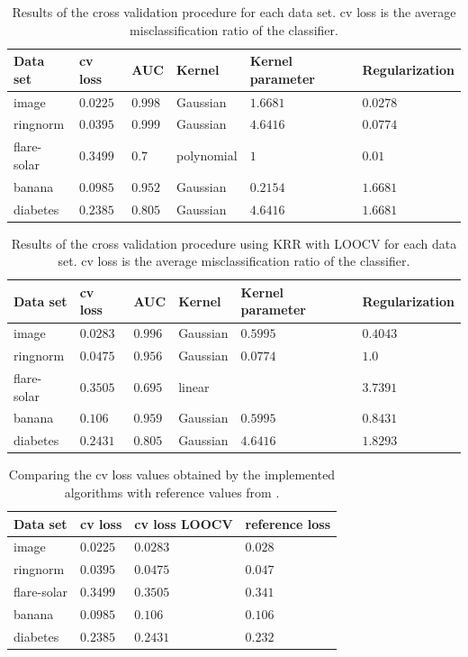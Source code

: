 \documentclass[a4paper, 11pt, titlepage]{article}
\begin{document}
\begin{table}
	\centering
	\begin{tabular}{llllll}
	Data set& cv loss & AUC & Kernel & Kernel parameter& Regularization\\
	\hline
	image & $0.0225$ & $0.998$ & Gaussian & $1.6681$& $0.0278$\\
	ringnorm & $0.0395$& $0.999$ &Gaussian & $4.6416$& $0.0774$\\
	flare-solar & $0.3499$& $0.7$& polynomial& $1$ & $0.01$\\
	banana & $0.0985$& $0.952$& Gaussian & $0.2154$ & $1.6681$\\
	diabetes & $0.2385$ & $0.805$ & Gaussian& $4.6416$& $1.6681$
	\end{tabular}
	\caption{Results of the cross validation procedure for each data set. cv loss is the average misclassification ratio of the classifier.}
	\label{tab:results}
\end{table}

\begin{table}
	\centering
	\begin{tabular}{llllll}
	Data set& cv loss& AUC & Kernel & Kernel parameter& Regularization\\
	\hline
	image & $0.0283$& $0.996$ & Gaussian & $0.5995$& $0.4043$\\
	ringnorm & $0.0475$& $0.956$ & Gaussian & $0.0774$& $1.0$\\
	flare-solar & $0.3505$& $0.695$& linear&  & $3.7391$\\
	banana & $0.106$& $0.959$ & Gaussian & $0.5995$ & $0.8431$\\
	diabetes & $0.2431$ &  $0.805$ & Gaussian& $4.6416$& $1.8293$
	\end{tabular}
	\caption{Results of the cross validation procedure using KRR with LOOCV for each data set. cv loss is the average misclassification ratio of the classifier.}
	\label{tab:resultsLOOCV}
\end{table}

\begin{table}
	\centering
	\begin{tabular}{llll}
		Data set & cv loss & cv loss LOOCV & reference loss\\
		\hline
		image & $0.0225$ & $0.0283$ & $0.028$\\
		ringnorm & $0.0395$ & $0.0475$ & $0.047$ \\
		flare-solar & $0.3499$ & $0.3505$ & $0.341$\\
		banana & $0.0985$ & $0.106$ & $0.106$ \\
		diabetes & $0.2385$ & $0.2431$ & $0.232$
	\end{tabular}
	\caption{Comparing the cv loss values obtained by the implemented algorithms with reference values from \cite{Mueller13}.}
	\label{tab:refs}
\end{table}
\end{document}
